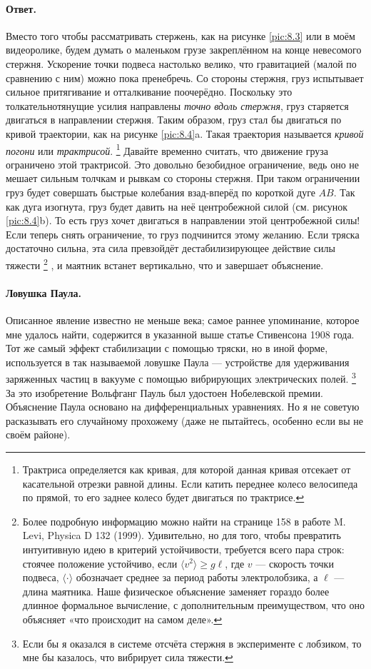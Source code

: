 \paragraph{Ответ.}
Вместо того чтобы рассматривать стержень, как на рисунке
\ref{pic:8.3} или в моём видеоролике, будем думать о маленьком грузе закреплённом на конце невесомого стержня.
Ускорение точки подвеса настолько велико, что гравитацией (малой по сравнению с ним) можно пока пренебречь.
Со стороны стержня, груз испытывает сильное притягивание и отталкивание поочерёдно.
Поскольку это толкательнотянущие усилия направлены \emph{точно вдоль стержня}, груз старяется двигаться в направлении стержня.
Таким образом, груз стал бы двигаться по кривой траектории, как на рисунке \ref{pic:8.4}a.
Такая траектория называется \emph{кривой погони} или \emph{трактрисой}.%
\footnote{Трактриса определяется как кривая, для которой данная кривая отсекает от касательной отрезки равной длины. Если катить переднее колесо велосипеда по прямой, то его заднее колесо будет двигаться по трактрисе.}
Давайте временно считать, что движение груза ограничено этой трактрисой.
Это довольно безобидное ограничение, ведь оно не мешает сильным толчкам и рывкам со стороны стержня.
При таком ограничении груз будет совершать быстрые колебания взад-вперёд по короткой дуге $AB$.
Так как дуга изогнута, груз будет давить на неё центробежной силой (см. рисунок \ref{pic:8.4}b).
То есть груз хочет двигаться в направлении этой центробежной силы!
Если теперь снять ограничение, то груз подчинится этому желанию.
Если тряска достаточно сильна, эта сила превзойдёт дестабилизирующее действие силы тяжести%
\footnote{Более подробную информацию можно найти на странице 158 в работе M. Levi, Physica D 132 (1999).
Удивительно, но для того, чтобы превратить интуитивную идею в критерий устойчивости, требуется всего пара строк: стоячее положение устойчиво, если  $
\langle v^2 \rangle \ge g \ell$,
где $v$ --- скорость точки подвеса, $\langle \cdot \rangle$ обозначает среднее за период работы электролобзика, а $\ell$ --- длина маятника.
Наше физическое объяснение заменяет гораздо более длинное формальное вычисление, с дополнительным преимуществом, что оно объясняет «что происходит на самом деле».}%
, и маятник встанет вертикально,
что и завершает объяснение.

\paragraph{Ловушка Паула.}
Описанное явление известно не меньше века;
самое раннее упоминание, которое мне удалось найти, содержится в указанной выше статье Стивенсона 1908 года.
Тот же самый эффект стабилизации с помощью тряски, но в иной форме, используется в так называемой ловушке Паула --- устройстве для удерживания заряженных частиц в вакууме с помощью вибрирующих электрических полей.%
\footnote{Если бы я оказался в системе отсчёта стержня в эксперименте с лобзиком, то мне бы казалось, что вибрирует сила тяжести.}
За это изобретение Вольфганг Пауль был удостоен Нобелевской премии.
Объяснение Паула основано на дифференциальных уравнениях.
Но я не советую расказывать его случайному прохожему (даже не пытайтесь, особенно если вы не своём районе).


